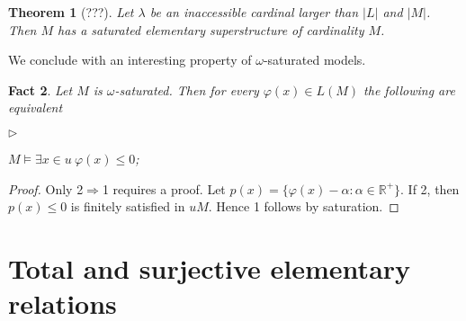 \documentclass[12pt,letterpaper,oneside,reqno]{amsart}
\newcommand{\mylabel}[1]{{#1}\hfill}
\renewenvironment{itemize}
  {\begin{list}{$\triangleright$}{%
   \setlength{\parskip}{0mm}
   \setlength{\topsep}{.2\baselineskip}
   \setlength{\rightmargin}{0mm}
   \setlength{\listparindent}{0mm}
   \setlength{\itemindent}{0mm}
   \setlength{\labelwidth}{3ex}
   \setlength{\itemsep}{.2\baselineskip}
   \setlength{\parsep}{.2\baselineskip}
   \setlength{\partopsep}{0mm}
   \setlength{\labelsep}{1ex}
   \setlength{\leftmargin}{\labelwidth+\labelsep}
   \let\makelabel\mylabel}}{%
   \end{list}}
\theoremstyle{plain}
\newtheorem{theorem}{Theorem}%
\newtheorem{fact}[theorem]{Fact}
\theoremstyle{remark}
\renewcommand*{\emph}[1]{%
   \smash{\tikz[baseline]\node[rectangle, fill=olive!25, rounded corners, inner xsep=0.5ex, inner ysep=0.2ex, anchor=base, minimum height = 2.7ex]{#1};}}
\begin{document}
\begin{theorem}[???]
  Let $\lambda$ be an inaccessible cardinal larger than $|L|$ and $|M|$.
  Then $M$ has a saturated elementary superstructure of cardinality $M$. 
\end{theorem}

We conclude with an interesting property of $\omega$-saturated models.

\begin{fact}\label{fact_existential}
  Let $M$ is $\omega$-saturated.
  Then for every $\varphi(x)\in L(M)$ the following are equivalent
  \begin{itemize}
    \item[1.] $M\models\exists x\in u\ \varphi(x)\le0$;
    \item[2.] 
  \end{itemize}
\end{fact}
\begin{proof}
  Only 2$\Rightarrow$1 requires a proof.
  Let $p(x)=\{\varphi(x)-\alpha: \alpha\in{\mathds R}^+\}$.
  If 2, then $p(x)\le0$ is finitely satisfied in $uM$.
  Hence 1 follows by saturation.
\end{proof}









\section{Total and surjective elementary relations}
\end{document}
